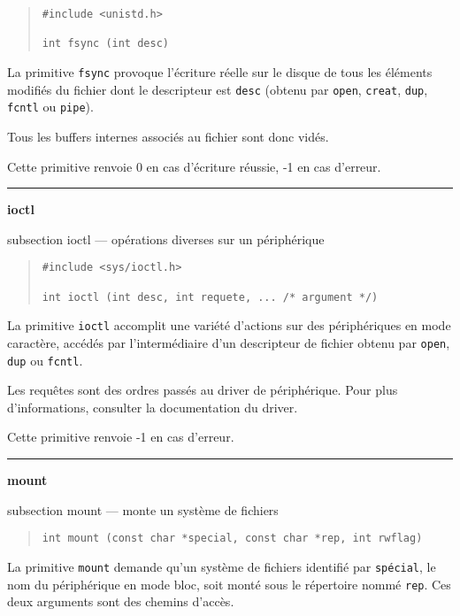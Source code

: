 \documentclass [twoside] {report}
\newcommand {\primitive} [1]
    {
	{\large \bf #1}
	\addcontentsline {toc} {subsection} {#1}
    }
\newcommand {\separation}
    {
	\vspace {7mm}
	\nopagebreak
	\hrule
    }
\begin{document}
\begin {quote}
\begin {verbatim}
#include <unistd.h>

int fsync (int desc)
\end{verbatim}
\end {quote}

La primitive {\tt fsync} provoque l'écriture réelle
sur le disque de tous les éléments modifiés du fichier dont le
descripteur est {\tt desc} (obtenu par {\tt open},
{\tt creat}, {\tt dup}, {\tt fcntl} ou {\tt pipe}).

Tous les buffers internes associés au fichier
sont donc vidés.

Cette primitive renvoie 0 en cas d'écriture
réussie, -1 en cas d'erreur.




\separation
\primitive {ioctl} --- opérations diverses sur un périphérique

\begin {quote}
\begin {verbatim}
#include <sys/ioctl.h>

int ioctl (int desc, int requete, ... /* argument */)
\end{verbatim}
\end {quote}

La primitive {\tt ioctl} accomplit une variété
d'actions sur des périphériques en mode caractère,
accédés par l'intermédiaire d'un descripteur de
fichier obtenu par {\tt open}, {\tt dup} ou {\tt fcntl}.

Les requêtes sont des ordres passés au driver de
périphérique. Pour plus d'informations, consulter
la documentation du driver.

Cette primitive renvoie -1 en cas d'erreur.




\separation
\primitive {mount} --- monte un système de fichiers

\begin {quote}
\begin {verbatim}
int mount (const char *special, const char *rep, int rwflag)
\end{verbatim}
\end {quote}

La primitive {\tt mount} demande qu'un système de
fichiers identifié par {\tt spécial}, le nom du périphérique en
mode bloc, soit monté sous le répertoire nommé
{\tt rep}. Ces deux arguments sont des chemins
d'accès.
\end{document}
